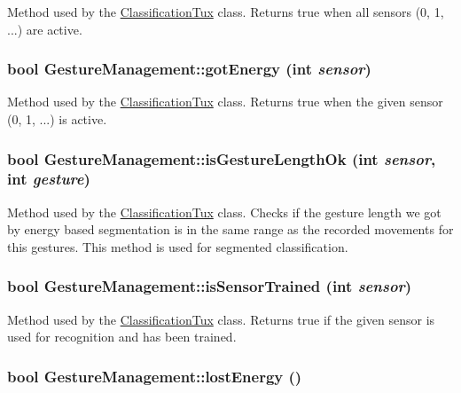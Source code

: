 \label{classGestureManagement_a792bf83b1fe0b7cd3adee6a1ad967683}
Method used by the \hyperlink{classClassificationTux}{ClassificationTux} class. Returns true when all sensors (0, 1, ...) are active. \hypertarget{classGestureManagement_a7a3d84bf9ff0ac8f04ccf28603f49130}{
\subsubsection[{gotEnergy}]{\setlength{\rightskip}{0pt plus 5cm}bool GestureManagement::gotEnergy (int {\em sensor})}}
\label{classGestureManagement_a7a3d84bf9ff0ac8f04ccf28603f49130}
Method used by the \hyperlink{classClassificationTux}{ClassificationTux} class. Returns true when the given sensor (0, 1, ...) is active. \hypertarget{classGestureManagement_a4c11724fd1e387800056963e2318b70d}{
\subsubsection[{isGestureLengthOk}]{\setlength{\rightskip}{0pt plus 5cm}bool GestureManagement::isGestureLengthOk (int {\em sensor}, \/  int {\em gesture})}}
\label{classGestureManagement_a4c11724fd1e387800056963e2318b70d}
Method used by the \hyperlink{classClassificationTux}{ClassificationTux} class. Checks if the gesture length we got by energy based segmentation is in the same range as the recorded movements for this gestures. This method is used for segmented classification. \hypertarget{classGestureManagement_aafb7ac8ecc9567078fb3e4d76ff75f63}{
\subsubsection[{isSensorTrained}]{\setlength{\rightskip}{0pt plus 5cm}bool GestureManagement::isSensorTrained (int {\em sensor})}}
\label{classGestureManagement_aafb7ac8ecc9567078fb3e4d76ff75f63}
Method used by the \hyperlink{classClassificationTux}{ClassificationTux} class. Returns true if the given sensor is used for recognition and has been trained. \hypertarget{classGestureManagement_ad934138db81f43f1af34cacd6e080b01}{
\subsubsection[{lostEnergy}]{\setlength{\rightskip}{0pt plus 5cm}bool GestureManagement::lostEnergy ()}}
